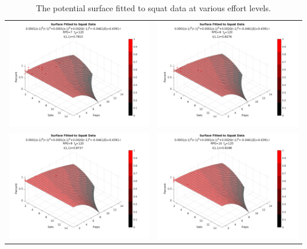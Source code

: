 \begin{table}[h]
\begin{tabular}{c|c}
        \includegraphics[width=78mm]{SquatSurface/7.png} &
        \includegraphics[width=78mm]{SquatSurface/8.png} \\
        
        \includegraphics[width=78mm]{SquatSurface/9.png} &
        \includegraphics[width=78mm]{SquatSurface/10.png} \\
    \end{tabular}
    \caption{The potential surface fitted to squat data at various effort levels.}
    \label{tab:AppBSquatPotentialSurfaceAcrossEffort}
\end{table}

